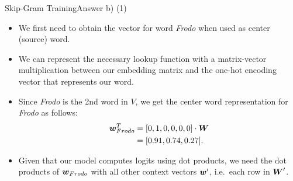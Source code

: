 \documentclass[t]{beamer}
\begin{document}
\begin{frame}{Skip-Gram Training}{Answer b) (1)}
    \begin{itemize}
        \item We first need to obtain the vector for word \textit{Frodo} when
              used as center (source) word.
        \item We can represent the necessary lookup function with a
              matrix-vector multiplication between our embedding matrix and the
              one-hot encoding vector that represents our word.
        \item Since \textit{Frodo} is the 2nd word in $V$, we get the center
              word representation for \textit{Frodo} as follows:
              \begin{align*}
                  {\boldsymbol{w}}_{Frodo}^T & = [0, 1, 0, 0, 0, 0] \cdot {\boldsymbol{W}} \\
                                & = [0.91, 0.74, 0.27].
              \end{align*}
        \item Given that our model computes logits using dot products, we need
              the dot products of ${\boldsymbol{w}}_{Frodo}$ with all other context vectors
              ${\boldsymbol{w}}'$, i.e.\ each row in ${\boldsymbol{W}}'$.
    \end{itemize}
\end{frame}
\end{document}
